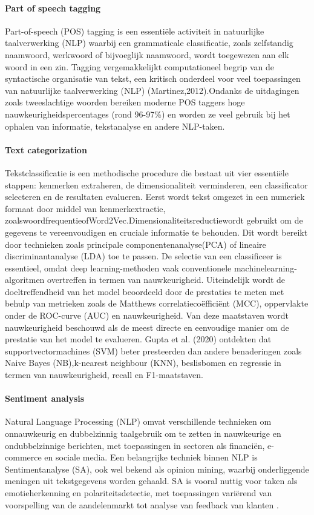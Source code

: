 \paragraph{Part of speech tagging}
Part-of-speech (POS) tagging is een essentiële activiteit in natuurlijke taalverwerking (NLP) waarbij een grammaticale classificatie, zoals zelfstandig naamwoord, werkwoord of bijvoeglijk naamwoord, wordt toegewezen aan elk woord in een zin. Tagging vergemakkelijkt computationeel begrip van de syntactische organisatie van tekst, een kritisch onderdeel voor veel toepassingen van natuurlijke taalverwerking (NLP) (Martinez,2012).Ondanks de uitdagingen zoals tweeslachtige woorden bereiken moderne POS taggers hoge nauwkeurigheidspercentages (rond 96-97\%) en worden ze veel gebruik bij het ophalen van informatie, tekstanalyse en andere NLP-taken\autocite{Martinez2024}.
\paragraph{Text categorization}
Tekstclassificatie is een methodische procedure die bestaat uit vier essentiële stappen: kenmerken extraheren, de dimensionaliteit verminderen, een classificator selecteren en de resultaten evalueren. Eerst wordt tekst omgezet in een numeriek formaat door middel van kenmerkextractie, zoalswoordfrequentieofWord2Vec.Dimensionaliteitsreductiewordt gebruikt om de gegevens te vereenvoudigen en cruciale informatie te behouden. Dit wordt bereikt door technieken zoals principale componentenanalyse(PCA) of lineaire discriminantanalyse (LDA) toe te passen. De selectie van een classificeer is essentieel, omdat deep learning-methoden vaak conventionele machinelearning-algoritmen overtreffen in termen van nauwkeurigheid. Uiteindelijk wordt de doeltreffendheid van het model beoordeeld door de prestaties te meten met behulp van metrieken zoals de Matthews correlatiecoëfficiënt (MCC), oppervlakte onder de ROC-curve (AUC) en nauwkeurigheid. Van deze maatstaven wordt nauwkeurigheid beschouwd als de meest directe en eenvoudige manier om de prestatie van het model te evalueren. Gupta et al. (2020) ontdekten dat supportvectormachines (SVM) beter presteerden dan andere benaderingen zoals Naive Bayes (NB),k-nearest neighbour (KNN), beslisbomen en regressie in termen van nauwkeurigheid, recall en F1-maatstaven.
\paragraph{Sentiment analysis}
Natural Language Processing (NLP) omvat verschillende technieken om onnauwkeurig en dubbelzinnig taalgebruik om te zetten in nauwkeurige en ondubbelzinnige berichten, met toepassingen in sectoren als financiën, e-commerce en sociale media. Een belangrijke techniek binnen NLP is Sentimentanalyse (SA), ook wel bekend als opinion mining, waarbij onderliggende meningen uit tekstgegevens worden gehaald. SA is vooral nuttig voor taken als emotieherkenning en polariteitsdetectie, met toepassingen variërend van voorspelling van de aandelenmarkt tot analyse van feedback van klanten \autocite{Gupta2020}.


